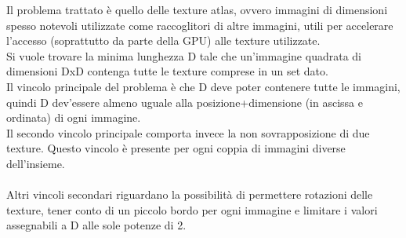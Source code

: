  

Il problema trattato è quello delle texture atlas, ovvero immagini di dimensioni spesso notevoli utilizzate come raccoglitori di altre immagini, utili per accelerare l’accesso (soprattutto da parte della GPU) alle texture utilizzate. \\
Si vuole trovare la minima lunghezza D tale che un’immagine quadrata di dimensioni DxD contenga tutte le texture comprese in un set dato. \\
Il vincolo principale del problema è che D deve poter contenere tutte le immagini, quindi D dev’essere almeno uguale alla posizione+dimensione (in ascissa e ordinata) di ogni immagine. \\
Il secondo vincolo principale comporta invece la non sovrapposizione di due texture. Questo vincolo è presente per ogni coppia di immagini diverse dell’insieme. \\
\ \\
Altri vincoli secondari riguardano la possibilità di permettere rotazioni delle texture, tener conto di un piccolo bordo per ogni immagine e limitare i valori assegnabili a D alle sole potenze di 2.







	\newpage